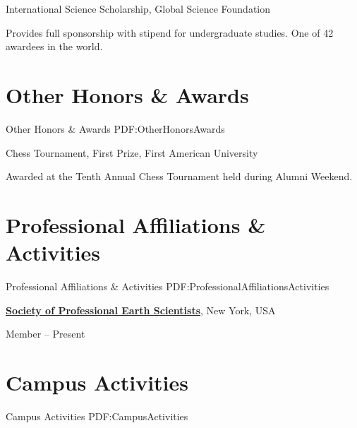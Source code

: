 \documentclass[a4paper,10pt,oneside]{article}
\begin{document}
\begin{body}
\EntryGap
International Science Scholarship,
Global Science Foundation
\hfill
{}
\begin{detail}
Provides full sponsorship with stipend for undergraduate studies.
One of 42 awardees in the world.
\end{detail}


\section
{Other Honors\newline
\& Awards}
{Other Honors \& Awards}
{PDF:OtherHonorsAwards}

Chess Tournament,
First Prize,
First American University
\hfill
{}
\begin{detail}
Awarded at the Tenth Annual Chess Tournament held during Alumni Weekend.
\end{detail}


\section
{Professional Affiliations\newline
\& Activities}
{Professional Affiliations \& Activities}
{PDF:ProfessionalAffiliationsActivities}

\href{http://www.example.com/my-society}
{\textbf{Society of Professional Earth Scientists}},
New York, USA
\par
Member
\hfill
{} --
Present


\section
{Campus Activities}
{Campus Activities}
{PDF:CampusActivities}



\end{body}
\end{document}
